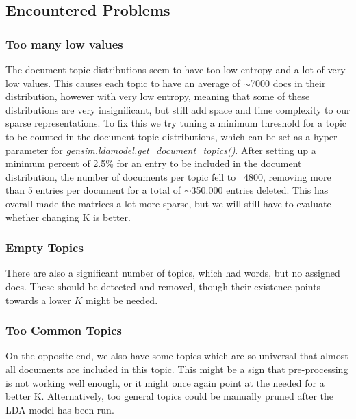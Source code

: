 \subsection{Encountered Problems}

\subsubsection{Too many low values}
The document-topic distributions seem to have too low entropy and a lot of very low values.
This causes each topic to have an average of $\sim$7000 docs in their distribution, however with very low entropy, meaning that some of these distributions are very insignificant, but still add space and time complexity to our sparse representations.
To fix this we try tuning a minimum threshold for a topic to be counted in the document-topic distributions, which can be set as a hyper-parameter for \emph{gensim.ldamodel.get\_document\_topics()}.
After setting up a minimum percent of 2.5\% for an entry to be included in the document distribution, the number of documents per topic fell to ~4800, removing more than 5 entries per document for a total of $\sim$350.000 entries deleted. 
This has overall made the matrices a lot more sparse, but we will still have to evaluate whether changing K is better.

\subsubsection{Empty Topics}
There are also a significant number of topics, which had words, but no assigned docs. 
These should be detected and removed, though their existence points towards a lower $K$ might be needed.

\subsubsection{Too Common Topics}
On the opposite end, we also have some topics which are so universal that almost all documents are included in this topic. 
This might be a sign that pre-processing is not working well enough, or it might once again point at the needed for a better K.
Alternatively, too general topics could be manually pruned after the LDA model has been run.

